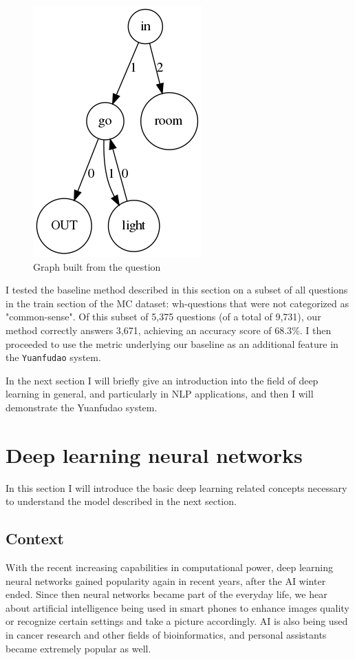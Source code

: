 \begin{figure}
	\centering
	\includegraphics[scale=0.4]{figures/compdef}
	\caption{Graph built from the question}
	\label{fig:merge3}
\end{figure}

I tested the baseline method described in this section on a
subset of all questions in the train section of the MC dataset:
wh-questions that were not
categorized as "common-sense". Of this subset of 5,375 questions (of a
total of 9,731), our
method correctly answers 3,671, achieving an accuracy score of $68.3\%$.
I then proceeded to use the metric underlying our baseline as an
additional feature in the \texttt{Yuanfudao} system. 

In the next section I will briefly give an introduction into the field of deep learning in general, and particularly in NLP applications, and then I will demonstrate the Yuanfudao system.
\section{Deep learning neural networks}
\label{sec:deep}

In this section I will introduce the basic deep learning related concepts necessary to understand the model described in the next section.

\subsection{Context}
With the recent increasing capabilities in computational power,
deep learning neural networks gained popularity again in recent years, after the AI winter ended. Since then neural networks became part of the everyday life, we hear about artificial intelligence being used in smart phones to enhance images quality or recognize certain settings and take a picture accordingly. AI is also being used in cancer research and other fields of bioinformatics, and personal assistants became extremely popular as well.

